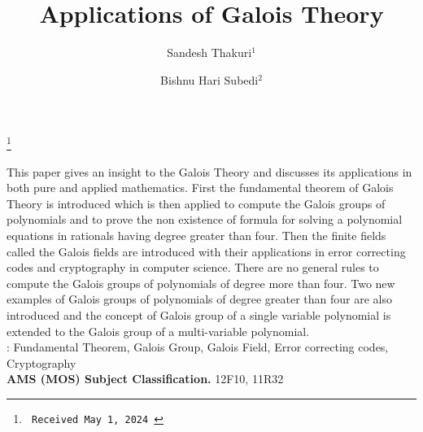 \documentclass[11pt]{amsart}
\theoremstyle{plain}
\theoremstyle{definition}
\numberwithin{equation}{section}
\begin{document}
	\newcommand{\T}{\mathbb{T}}
	\newcommand{\R}{\mathbb{R}}
	\newcommand{\Q}{\mathbb{Q}}
	\newcommand{\N}{\mathbb{N}}
	\newcommand{\Z}{\mathbb{Z}}
	\newcommand{\tx}[1]{\quad\mbox{#1}\quad}


\title [Applications of Galois Theory]
{Applications of Galois Theory}
\author[Sandesh Thakuri, Bishnu Hari Subedi]{Sandesh Thakuri$^1$ \and Bishnu Hari Subedi$^2$}
\address{
  $^{1,2}$ Central Department of Mathematics, TU, Nepal\\[-2mm]
  {\tiny sandeshthakuri111@gmail.com}}

\vspace{-.2cm}
\thanks{\hspace{-.5cm}\tt
	Received  May 1, 2024
	\hfill }


\maketitle
\thispagestyle{empty}

{\footnotesize
   {This paper gives an insight to the Galois Theory and discusses its applications in both pure and applied mathematics. First the fundamental theorem of Galois Theory is introduced which is then applied to compute the Galois groups of polynomials and to prove the non existence of formula for solving a polynomial equations in rationals having degree greater than four. Then the finite fields called the Galois fields are introduced with their applications in error correcting codes and cryptography in computer science. There are no general rules to compute the Galois groups of polynomials of degree more than four. Two new examples of Galois groups of polynomials of degree greater than four are also introduced and the concept of Galois group of a  single variable polynomial is extended to the Galois group of a multi-variable polynomial.}\\

  : Fundamental Theorem, Galois Group, Galois Field, Error correcting codes, Cryptography\\
  \bfseries AMS (MOS) Subject Classification.} 12F10, 11R32

\vspace{4mm}
\end{document}
